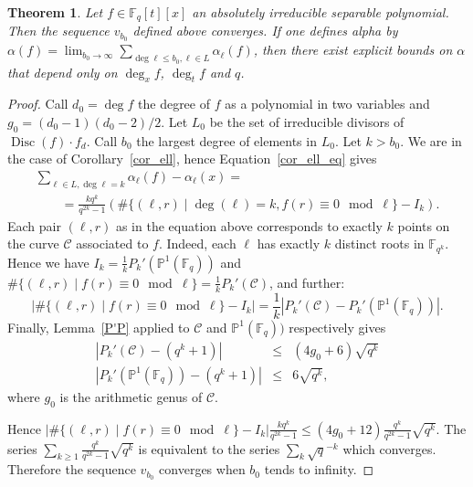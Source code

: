 \documentclass[a4wide]{article}
\newcommand{\F}{{\mathbb F}}
\DeclareMathOperator{\Disc}{Disc}
\theoremstyle{plain}
\newtheorem{theo}{Theorem}[section]
\theoremstyle{definition}
\theoremstyle{remark}
\begin{document}
\begin{theo} \label{alpha_convergence}Let $f\in\F_q[t][x]$ an absolutely
	irreducible separable polynomial.  Then the sequence $v_{b_0}$ defined above converges. If one defines alpha
	by $\alpha(f)=\lim_{b_0\rightarrow\infty} \sum_{\deg \ell\leq b_0, \ell\in L}\alpha_\ell(f)$, then there exist explicit bounds on $\alpha$ that depend only on $\deg_xf$, $\deg_t f$ and $q$. 

\end{theo}
\begin{proof}
Call $d_0=\deg f$ the degree of $f$ as a polynomial in two variables and
$g_0=(d_0-1)(d_0-2)/2$. Let $L_0$ be the set of
irreducible divisors of $\Disc(f)\cdot f_d$. Call $b_0$ the largest degree of elements in $L_0$. Let
        $k > b_0$. We are in the case of Corollary~\ref{cor_ell}, hence
        Equation~\ref{cor_ell_eq} gives
\begin{eqnarray*}\label{eq1}
	\sum_{\ell\in L, \deg \ell=k}
	\alpha_\ell(f)-\alpha_\ell(x)=\qquad\qquad\qquad\qquad\qquad\\
\qquad=\frac{kq^k}{q^{2k}-1}\left(\#\{(\ell,r)\mid
	\deg(\ell)=k, f(r)\equiv
0\mod\ell\}-I_k\right).
\end{eqnarray*}
Each pair $(\ell,r)$ as in the equation above corresponds to exactly $k$ points on
the curve $\mathcal{C}$ associated to $f$. Indeed, each $\ell$ has
exactly $k$ distinct roots in $\F_{q^k}$.
Hence we have $I_k=\frac{1}{k}P_k'(\mathbb{P}^1(\F_q))$
and $\#\{(\ell,r)\mid f(r)\equiv
0\mod\ell\}=\frac{1}{k}P_k'(\mathcal{C})$, and further:
\begin{equation}\label{eq2}
\left |\#\{(\ell,r)\mid f(r)\equiv
0\mod\ell\}-I_k\right|=\frac{1}{k}\left|P_k'(\mathcal{C})-P_k'(
\mathbb{P}^1(\F_q)) \right|.
\end{equation}
Finally, Lemma~\ref{P'P} applied to $\mathcal{C}$ and
$\mathbb{P}^1(\F_q))$
respectively gives
\begin{eqnarray}\label{double}
	\left|P_k'(\mathcal{C})-(q^k+1)\right|&\leq &(4g_0+6)\sqrt{q^k}\\
	      \left|P_k'(\mathbb{P}^1(\F_q))-(q^k+1)\right|&\leq
                                                    &6\sqrt{q^k},
\end{eqnarray}
where $g_0$ is the arithmetic genus of $\mathcal{C}$.

Hence
$\left| \#\{(\ell,r)\mid f(r)\equiv
0\mod\ell\}-I_k \right|\frac{kq^k}{q^{2k}-1}\leq
(4g_0+12)\frac{q^k}{q^{2k}-1}\sqrt{q^k}$. The series $\sum_{k\geq
1}\frac{q^k}{q^{2k}-1}\sqrt{q^k}$ is equivalent to the series $\sum_k
\sqrt{q}^{-k}$ which converges. Therefore the sequence
$v_{b_0}$ converges when $b_0$ tends to infinity.



\end{proof}
\end{document}
